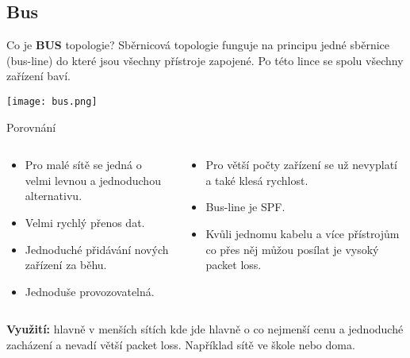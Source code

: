 \documentclass{beamer}
\begin{document}
\subsection{Bus}
\label{sec:bus}
\begin{frame}{Co je \textbf{BUS} topologie?}
 Sběrnicová topologie funguje na principu jedné sběrnice (bus-line) do které
 jsou všechny přístroje zapojené. Po této lince se spolu všechny zařízení baví.

 \texttt{[image: bus.png]}
\end{frame}

\begin{frame}{Porovnání}

\begin{columns}
    \begin{column}{0.45\textwidth}
        \begin{itemize}
            \item Pro malé sítě se jedná o velmi levnou a jednoduchou
             alternativu.
            \item Velmi rychlý přenos dat.
            \item Jednoduché přidávání nových zařízení za běhu.
            \item Jednoduše provozovatelná.
        \end{itemize}
    \end{column}
    \begin{column}{0.45\textwidth}  %
        \begin{itemize}
            \item Pro větší počty zařízení se už nevyplatí a také klesá
             rychlost.
            \item Bus-line je SPF.
            \item Kvůli jednomu kabelu a více přístrojům co přes něj můžou
             posílat je vysoký packet loss.
        \end{itemize}
    \end{column}
    \end{columns}
    \vspace{10pt}

\textbf{Využití:} hlavně v menších sítích kde jde hlavně o co nejmenší cenu a
jednoduché zacházení a nevadí větší packet loss. Například sítě ve škole nebo
doma.

\end{frame}
\end{document}
